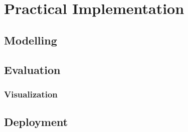 \chapter{Practical Implementation}
	

\section{Modelling}
\section{Evaluation}
	\subsection{Visualization}
\section{Deployment}